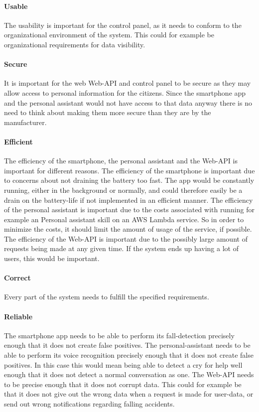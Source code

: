 \paragraph{Usable}
The usability is important for the control panel, as it needs to conform to the organizational environment of the system.
This could for example be organizational requirements for data visibility.

\paragraph{Secure}
It is important for the web Web-API and control panel to be secure as they may allow access to personal information for the citizens.
Since the smartphone app and the personal assistant would not have access to that data anyway there is no need to think about making them more secure than they are by the manufacturer.

\paragraph{Efficient}
The efficiency of the smartphone, the personal assistant and the Web-API is important for different reasons.
The efficiency of the smartphone is important due to concerns about not draining the battery too fast. The app would be constantly running, either in the background or normally, and could therefore easily be a drain on the battery-life if not implemented in an efficient manner.
The efficiency of the personal assistant is important due to the costs associated with running for example an Personal assistant skill on an AWS Lambda service. So in order to minimize the costs, it should limit the amount of usage of the service, if possible.
The efficiency of the Web-API is important due to the possibly large amount of requests being made at any given time. If the system ends up having a lot of users, this would be important.

\paragraph{Correct}
Every part of the system needs to fulfill the specified requirements.

\paragraph{Reliable}
The smartphone app needs to be able to perform its fall-detection precisely enough that it does not create false positives.
The personal-assistant needs to be able to perform its voice recognition precisely enough that it does not create false positives. In this case this would mean being able to detect a cry for help well enough that it does not detect a normal conversation as one.
The Web-API needs to be precise enough that it does not corrupt data. This could for example be
that it does not give out the wrong data when a request is made for user-data, or send out wrong notifications regarding falling accidents.


